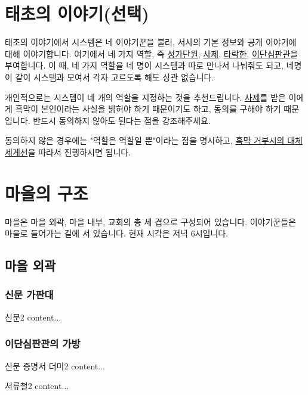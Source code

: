 \documentclass{report}
\begin{document}
	\section{태초의 이야기(선택)}
		태초의 이야기에서 시스템은 네 이야기꾼을 불러, 서사의 기본 정보와 공개 이야기에 대해 이야기합니다. 여기에서 네 가지 역할, 즉 \hyperlink{cursed-bard}{성가단원}, \hyperlink{cowardly-priest}{사제}, \hyperlink{corrupt-paladin}{타락한}, \hyperlink{hurt-rogue}{이단심판관}을 부여합니다. 이 때, 네 가지 역할을 네 명이 시스템과 따로 만나서 나눠줘도 되고, 네명이 같이 시스템과 모여서 각자 고르도록 해도 상관 없습니다.
		
		개인적으로는 시스템이 네 개의 역할을 지정하는 것을 추천드립니다. \hyperlink{cowardly-priest}{사제}를 받은 이에게 흑막이 본인이라는 사실을 밝혀야 하기 때문이기도 하고, 동의를 구해야 하기 때문입니다. 반드시 동의하지 않아도 된다는 점을 강조해주세요.
		
		동의하지 않은 경우에는 "역할은 역할일 뿐"이라는 점을 명시하고, \hyperlink{alternative:no-criminal}{흑막 거부시의 대체 세계선}을 따라서 진행하시면 됩니다.
	
	\section{마을의 구조}
		마을은 마을 외곽, 마을 내부, 교회의 총 세 겹으로 구성되어 있습니다. 이야기꾼들은 마을로 들어가는 길에 서 있습니다. 현재 시각은 저녁 6시입니다.
			\subsection*{마을 외곽}
				\hypertarget{search:newspaper-stand}{}
				\subsubsection*{신문 가판대}
					\begin{spoiler}{신문}{2}
						content...
					\end{spoiler}
				
				\hypertarget{search:rogue-bag}{}
				\subsubsection*{이단심판관의 가방}
					\begin{spoiler}{신분 증명서 더미}{2}
						content...
					\end{spoiler}
					
					\begin{spoiler}{서류철}{2}
						content...
					\end{spoiler}
					
\end{document}
